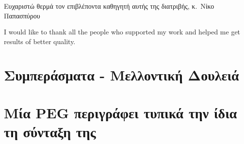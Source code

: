 \documentclass[diploma]{softlab-thesis}
\begin{document}

\begin{acknowledgementsgr}
  Ευχαριστώ θερμά τον επιβλέποντα καθηγητή αυτής της διατριβής,
  κ.~Νίκο Παπασπύρου
\end{acknowledgementsgr}

\begin{acknowledgementsen}
  I would like to thank all the people who supported my work and helped me get
  results of better quality.  
\end{acknowledgementsen}



\tableofcontents
\listoffigures


\mainmatter















\chapter{ Συμπεράσματα - Μελλοντική Δουλειά }



\nocite{*}






\backmatter

\appendix

\chapter{Μία PEG περιγράφει τυπικά την ίδια τη σύνταξη της}
\end{document}
